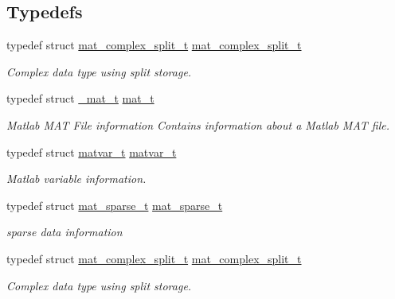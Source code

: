 \subsection*{Typedefs}
\begin{DoxyCompactItemize}
\item 
typedef struct \hyperlink{group___m_a_t_structmat__complex__split__t}{mat\+\_\+complex\+\_\+split\+\_\+t} \hyperlink{group___m_a_t_ga5604ebdeb88bb44efb635496740442bc}{mat\+\_\+complex\+\_\+split\+\_\+t}
\begin{DoxyCompactList}\small\item\em Complex data type using split storage. \end{DoxyCompactList}\item 
\mbox{\label{group___m_a_t_gab0fc888f5a5d79943b16284b1f91c2e8}} 
typedef struct \hyperlink{struct__mat__t}{\+\_\+mat\+\_\+t} \hyperlink{group___m_a_t_gab0fc888f5a5d79943b16284b1f91c2e8}{mat\+\_\+t}
\begin{DoxyCompactList}\small\item\em Matlab M\+AT File information Contains information about a Matlab M\+AT file. \end{DoxyCompactList}\item 
typedef struct \hyperlink{group___m_a_t_structmatvar__t}{matvar\+\_\+t} \hyperlink{group___m_a_t_ga24775c96a2a6d073581639c780b7896c}{matvar\+\_\+t}
\begin{DoxyCompactList}\small\item\em Matlab variable information. \end{DoxyCompactList}\item 
typedef struct \hyperlink{group___m_a_t_structmat__sparse__t}{mat\+\_\+sparse\+\_\+t} \hyperlink{group___m_a_t_gad1332d0eb4faa5a99377919f84b77baf}{mat\+\_\+sparse\+\_\+t}
\begin{DoxyCompactList}\small\item\em sparse data information \end{DoxyCompactList}\item 
typedef struct \hyperlink{group___m_a_t_structmat__complex__split__t}{mat\+\_\+complex\+\_\+split\+\_\+t} \hyperlink{group___m_a_t_ga5604ebdeb88bb44efb635496740442bc}{mat\+\_\+complex\+\_\+split\+\_\+t}
\begin{DoxyCompactList}\small\item\em Complex data type using split storage. \end{DoxyCompactList}\item 

\end{DoxyCompactItemize}

